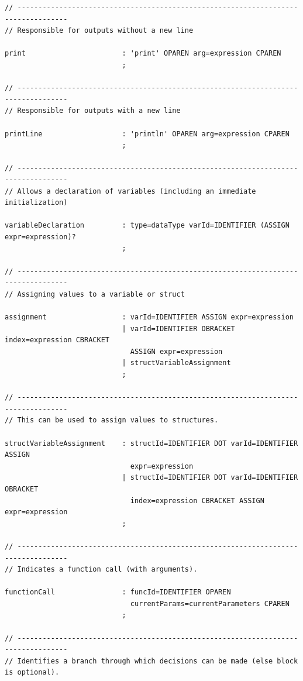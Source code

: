 \begin{lstlisting}[frame=htrbl, caption={Parser rules of grammar {\ttfamily E}}, label={lst:pe}, basicstyle=\scriptsize]
// ----------------------------------------------------------------------------------
// Responsible for outputs without a new line

print                       : 'print' OPAREN arg=expression CPAREN
                            ;

// ----------------------------------------------------------------------------------
// Responsible for outputs with a new line

printLine                   : 'println' OPAREN arg=expression CPAREN
                            ;

// ----------------------------------------------------------------------------------
// Allows a declaration of variables (including an immediate initialization)

variableDeclaration         : type=dataType varId=IDENTIFIER (ASSIGN expr=expression)?
                            ;

// ----------------------------------------------------------------------------------
// Assigning values to a variable or struct

assignment                  : varId=IDENTIFIER ASSIGN expr=expression
                            | varId=IDENTIFIER OBRACKET index=expression CBRACKET 
                              ASSIGN expr=expression
                            | structVariableAssignment
                            ;

// ----------------------------------------------------------------------------------
// This can be used to assign values to structures.

structVariableAssignment    : structId=IDENTIFIER DOT varId=IDENTIFIER ASSIGN
                              expr=expression
                            | structId=IDENTIFIER DOT varId=IDENTIFIER OBRACKET
                              index=expression CBRACKET ASSIGN expr=expression
                            ;

// ----------------------------------------------------------------------------------
// Indicates a function call (with arguments).

functionCall                : funcId=IDENTIFIER OPAREN 
                              currentParams=currentParameters CPAREN
                            ;

// ----------------------------------------------------------------------------------
// Identifies a branch through which decisions can be made (else block is optional).


\end{lstlisting}

